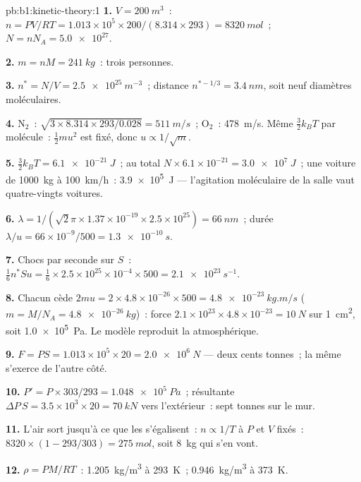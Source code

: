 \begin{solution}{pb:b1:kinetic-theory:1}
\textbf{1.} $V = \qty{200}{m^3}$~: $n = PV/RT = 1.013\times10^5 \times 200/(8.314
\times 293) = \qty{8320}{mol}$~; $N = nN_A = \num{5.0e27}$.

\textbf{2.} $m = nM = \qty{241}{kg}$~: trois personnes.

\textbf{3.} $n^* = N/V = \qty{2.5e25}{m^{-3}}$~; distance $n^{*-1/3} = \qty{3.4}{nm}$,
soit neuf diamètres moléculaires.

\textbf{4.} N$_2$~: $\sqrt{3 \times 8.314 \times 293/0.028} = \qty{511}{m/s}$~;
O$_2$~: \qty{478}{m/s}. Même $\tfrac32 k_BT$ par molécule~: $\tfrac12 mu^2$ est fixé,
donc $u \propto 1/\sqrt m$.

\textbf{5.} $\tfrac32 k_BT = \qty{6.1e-21}{J}$~; au total $N \times 6.1\times10^{-21}
= \qty{3.0e7}{J}$~; une voiture de \qty{1000}{kg} à \qty{100}{km/h}~: \qty{3.9e5}{J} ---
l'agitation moléculaire de la salle vaut quatre-vingts voitures.

\textbf{6.} $\lambda = 1/(\sqrt2\pi \times 1.37\times10^{-19} \times 2.5\times10^{25})
= \qty{66}{nm}$~; durée $\lambda/u = 66\times10^{-9}/500 = \qty{1.3e-10}{s}$.

\textbf{7.} Chocs par seconde sur $S$~: $\tfrac16 n^*Su = \tfrac16 \times 2.5\times
10^{25} \times 10^{-4} \times 500 = \qty{2.1e23}{s^{-1}}$.

\textbf{8.} Chacun cède $2mu = 2 \times 4.8\times10^{-26} \times 500 = \qty{4.8e-23}{kg.m/s}$
($m = M/N_A = \qty{4.8e-26}{kg}$)~: force $2.1\times10^{23} \times 4.8\times10^{-23}
= \qty{10}{N}$ sur \qty{1}{cm^2}, soit \qty{1.0e5}{Pa}. Le modèle reproduit
la  atmosphérique.

\textbf{9.} $F = PS = 1.013\times10^5 \times 20 = \qty{2.0e6}{N}$ --- deux cents
tonnes~; la même  s'exerce de l'autre côté.

\textbf{10.} $P' = P \times 303/293 = \qty{1.048e5}{Pa}$~; résultante $\Delta P\,S = 3.5
\times10^3 \times 20 = \qty{70}{kN}$ vers l'extérieur~: sept tonnes sur le mur.

\textbf{11.} L'air sort jusqu'à ce que les  s'égalisent~: $n \propto 1/T$ à
$P$ et $V$ fixés~: $8320 \times (1 - 293/303) = \qty{275}{mol}$, soit \qty{8}{kg}
qui s'en vont.

\textbf{12.} $\rho = PM/RT$~: \qty{1.205}{kg/m^3} à \qty{293}{K}~; \qty{0.946}{kg/m^3}
à \qty{373}{K}.


\end{solution}
